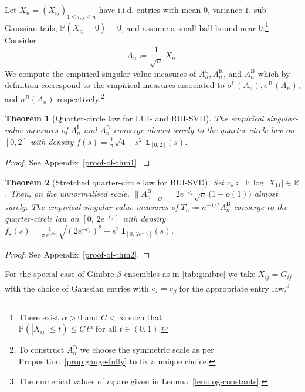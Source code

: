 \documentclass[11pt,a4paper]{article}
\newtheorem{theorem}{Theorem}[section]
\newcommand{\op}{\mathcal{O}}
\newcommand{\Prob}{\mathbb{P}}
\begin{document}
Let $X_n=(X_{ij})_{1\le i,j\le n}$ have i.i.d. entries with mean $0$, variance $1$, sub-Gaussian tails, $\Prob(X_{ij}=0)=0$, and assume a small-ball bound near $0$.\footnote{There exist $\alpha>0$ and $C<\infty$ such that \( \Prob(|X_{ij}|\le t)\le C\,t^{\alpha} \ \text{for all }t\in(0,1). \)} Consider 
\begin{equation}\label{eq:def-An}
A_n\coloneq \frac{1}{\sqrt n}\,X_n.
\end{equation}
We compute the empirical singular-value measures of $A^\mathrm{L}_n,A^\mathrm{R}_n$, and $A^\mathrm{B}_n$ which by definition correspond to the empirical measures associated to $\sigma^{\mathrm L}(A_n), \sigma^{\mathrm R}(A_n)$, and $\sigma^{\mathrm B}(A_n)$ respectively.\footnote{To construct $A_n^\mathrm B$ we choose the symmetric scale as per Proposition~\ref{prop:gauge-fully} to fix a unique choice.} 
\begin{theorem}[Quarter-circle law for LUI- and RUI-SVD]\label{thm:lui-rui-support}
The empirical singular-value measures of $A^\mathrm{L}_n$ and $A^\mathrm{R}_n$ converge almost surely to the quarter-circle law on $[0,2]$ with density $f(s)=\frac1\pi\sqrt{4-s^2}\,\mathbf{1}_{[0,2]}(s)$.
\end{theorem}
\begin{proof}
See Appendix~\ref{proof-of-thm1}.
\end{proof}
\begin{theorem}[Stretched quarter-circle law for BUI-SVD]\label{thm:uisvd-support}
Set $c_\star\coloneq \mathbb{E}\log|X_{11}|\in\mathbb{R}$. Then, on the unnormalised scale, $\|A^{\mathrm{B}}_n\|_{\op}=2e^{-c_\star}\sqrt n\,\big(1+o(1)\big)$ almost surely. The empirical singular-value measures of $T_n\coloneq n^{-1/2}A^{\mathrm{B}}_n$
converge to the quarter-circle law on $[0,\,2e^{-c_\star}]$ with density \(f_\star(s) = \frac{1}{\pi\,e^{-2c_\star}} \sqrt{(2e^{-c_\star})^2-s^2}\,\mathbf{1}_{[0,\,2e^{-c_\star}]}(s)\).
\end{theorem}
\begin{proof}
See Appendix~\ref{proof-of-thm2}.
\end{proof}
For the special case of Ginibre \(\beta\)-ensembles as in \cref{tab:ginibre} we take $X_{ij}=G_{ij}$ with the choice of Gaussian entries with $c_\star = c_\beta$ for the appropriate entry law.\footnote{The numerical values of \(c_\beta\) are given in Lemma~\ref{lem:log-constants}.} 
\end{document}
